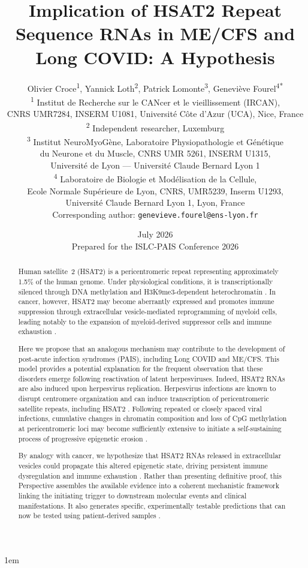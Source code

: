 \documentclass[11pt,a4paper]{scrartcl}
\title{Implication of HSAT2 Repeat Sequence RNAs in ME/CFS and Long COVID: A Hypothesis}
\author{%
  \begin{minipage}[t]{0.95\textwidth}
    \centering
    Olivier Croce\textsuperscript{1}, Yannick Loth\textsuperscript{2},
    Patrick Lomonte\textsuperscript{3}, Genevi\`{e}ve Fourel\textsuperscript{4*}\\[4pt]
    \small
    \textsuperscript{1} Institut de Recherche sur le CANcer et le vieillissement (IRCAN),\\
    \hspace*{1.2em} CNRS UMR7284, INSERM U1081, Universit\'e C\^ote d'Azur (UCA), Nice, France\\
    \textsuperscript{2} Independent researcher, Luxemburg\\
    \textsuperscript{3} Institut NeuroMyoG\`ene, Laboratoire Physiopathologie et G\'en\'etique\\
    \hspace*{1.2em} du Neurone et du Muscle, CNRS UMR 5261, INSERM U1315,\\
    \hspace*{1.2em} Universit\'e de Lyon --- Universit\'e Claude Bernard Lyon 1\\
    \textsuperscript{4} Laboratoire de Biologie et Mod\'elisation de la Cellule,\\
    \hspace*{1.2em} Ecole Normale Sup\'erieure de Lyon, CNRS, UMR5239, Inserm U1293,\\
    \hspace*{1.2em} Universit\'e Claude Bernard Lyon 1, Lyon, France\\[0.5em]
    \small *Corresponding author: \texttt{genevieve.fourel@ens-lyon.fr}
  \end{minipage}%
}
\date{July 2026 \\ \vspace{0.5em} \small Prepared for the ISLC-PAIS Conference 2026}
\begin{document}
\emergencystretch 1em
\maketitle

\begin{abstract}
  Human satellite~2 (HSAT2) is a pericentromeric repeat representing
  approximately 1.5\% of the human genome.  Under physiological
  conditions, it is transcriptionally silenced through DNA methylation
  and H3K9me3-dependent heterochromatin \cite{Shadle2019HSATII,
  Gerard2023CTCFpreprint}.  In cancer, however, HSAT2 may become
  aberrantly expressed and promotes immune suppression through
  extracellular vesicle-mediated reprogramming of myeloid cells,
  leading notably to the expansion of myeloid-derived suppressor cells
  and immune exhaustion \cite{Ruzanov2024ETSsatelliteEV}.

  Here we propose that an analogous mechanism may contribute to the
  development of post-acute infection syndromes (PAIS), including
  Long COVID and ME/CFS.  This model provides a potential explanation
  for the frequent observation that these disorders emerge following
  reactivation of latent herpesviruses.  Indeed, HSAT2 RNAs are also
  induced upon herpesvirus replication.  Herpesvirus infections are
  known to disrupt centromere organization and can induce transcription
  of pericentromeric satellite repeats, including HSAT2
  \cite{Lahaye2025centromere,Nogalski2019HSATII,Vourc_h2022HSF1SatIII}.
  Following repeated or closely spaced viral infections, cumulative
  changes in chromatin composition and loss of CpG methylation at
  pericentromeric loci may become sufficiently extensive to initiate a
  self-sustaining process of progressive epigenetic erosion
  \cite{BonnetFourel2026ProAB,deVega2014methylation,
  Helliwell2020methylation,Peppercorn2025methylation,
  Shadle2019HSATII}.

  By analogy with cancer, we hypothesize that HSAT2 RNAs released in
  extracellular vesicles could propagate this altered epigenetic state,
  driving persistent immune dysregulation and immune exhaustion
  \cite{Ruzanov2024ETSsatelliteEV}.  Rather than presenting definitive
  proof, this Perspective assembles the available evidence into a
  coherent mechanistic framework linking the initiating trigger to
  downstream molecular events and clinical manifestations.  It also
  generates specific, experimentally testable predictions that can now
  be tested using patient-derived samples
  \cite{Seimiya2023HSATII,Yoruker2026HSAT2cfDNA}.
\end{abstract}
\end{document}

